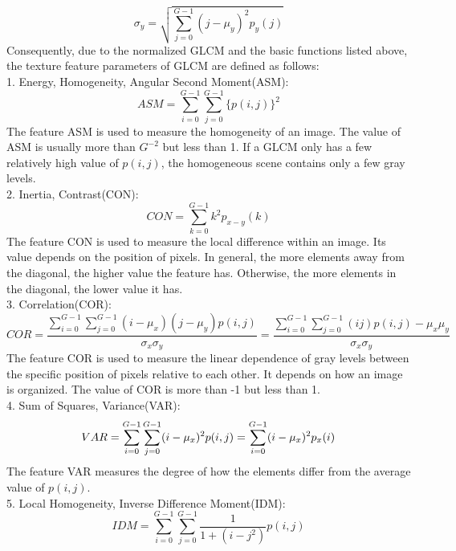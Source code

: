 \begin{equation}
\sigma_y = \sqrt{\sum_{j=0}^{G-1}(j-\mu_y)^2p_y(j)}
\end{equation}
Consequently, due to the normalized GLCM and the basic functions listed above, the texture feature parameters of GLCM are defined as follows\cite{Haralick}:\\
1. Energy, Homogeneity, Angular Second Moment(ASM): 
\begin{equation}
ASM = \sum_{i=0}^{G-1}\sum_{j=0}^{G-1}\{p(i,j)\}^2
\end{equation}
The feature ASM is used to measure the homogeneity of an image\cite{Peng}. The value of ASM is usually more than $G^{-2}$ but less than 1. If a GLCM only has a few relatively high value of $p(i,j)$, the homogeneous scene contains only a few gray levels\cite{Albregtsen}.\\
2. Inertia, Contrast(CON):
\begin{equation}
CON = \sum_{k=0}^{G-1}k^2p_{x-y}(k)
\end{equation}
The feature CON is used to measure the local difference within an image. Its value depends on the position of pixels. In general, the more elements away from the diagonal, the higher value the feature has. Otherwise, the more elements in the diagonal, the lower value it has.\\ 
3. Correlation(COR):
\begin{equation}
COR = \frac{\sum_{i=0}^{G-1}\sum_{j=0}^{G-1}(i-\mu_x)(j-\mu_y)p(i,j)}{\sigma_x\sigma_y} = \frac{\sum_{i=0}^{G-1}\sum_{j=0}^{G-1}(ij)p(i,j)-\mu_x\mu_y}{\sigma_x\sigma_y}
\end{equation}
The feature COR is used to measure the linear dependence of gray levels between the specific position of pixels relative to each other. It depends on how an image is organized. The value of COR is more than -1 but less than 1.\\
4. Sum of Squares, Variance(VAR):
\begin{equation}
VAR = \sum_{i=0}^{G-1}\sum_{j=0}^{G-1}(i-\mu_x)^2p(i,j) \\
    = \sum_{i=0}^{G-1}(i-\mu_x)^2p_x(i)
\end{equation}
The feature VAR measures the degree of how the elements differ from the average value of $p(i,j)$. \\
5. Local Homogeneity, Inverse Difference Moment(IDM):
\begin{equation}
IDM = \sum_{i=0}^{G-1}\sum_{j=0}^{G-1}\frac{1}{1+(i-j^2)}p(i,j)
\end{equation}
